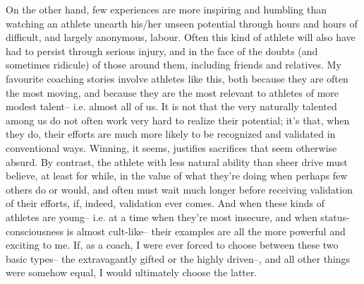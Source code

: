 On the other hand, few experiences are more inspiring and humbling than watching an athlete unearth his/her unseen potential through hours and hours of difficult, and largely anonymous, labour. Often this kind of athlete will also have had to persist through serious injury, and in the face of the doubts (and sometimes ridicule) of those around them, including friends and relatives. My favourite coaching stories involve athletes like this, both because they are often the most moving, and because they are the most relevant to athletes of more modest talent-- i.e. almost all of us. It is not that the very naturally talented among us do not often work very hard to realize their potential; it's that, when they do, their efforts are much more likely to be recognized and validated in conventional ways. Winning, it seems, justifies sacrifices that seem otherwise absurd. By contrast, the athlete with less natural ability than sheer drive must believe, at least for while, in the value of what they're doing when perhaps few others do or would, and often must wait much longer before receiving validation of their efforts, if, indeed, validation ever comes. And when these kinds of athletes are young-- i.e. at a time when they're most insecure, and when status-consciousness is almost cult-like-- their examples are all the more powerful and exciting to me. If, as a coach, I were ever forced to choose between these two basic types-- the extravagantly gifted or the highly driven--, and all other things were somehow equal, I would ultimately choose the latter.

